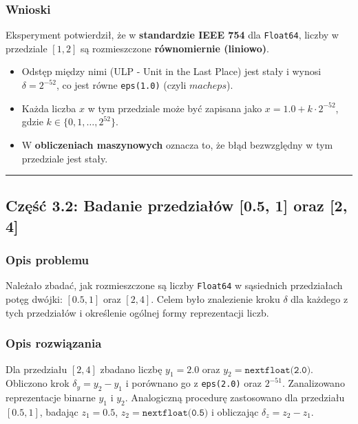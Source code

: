 \documentclass[11pt, a4paper]{article}
\newcommand{\taskseparator}{\leavevmode\leaders\hrule height 0.5pt\hfill\kern0pt}
\begin{document}
\subsubsection{Wnioski}
Eksperyment potwierdził, że w \textbf{standardzie IEEE 754} dla \texttt{Float64}, liczby w przedziale $[1, 2]$ są rozmieszczone \textbf{równomiernie (liniowo)}.
\begin{itemize}
    \item Odstęp między nimi (ULP - Unit in the Last Place) jest stały i wynosi $\delta = 2^{-52}$, co jest równe \texttt{eps(1.0)} (czyli $macheps$).
    \item Każda liczba $x$ w tym przedziale może być zapisana jako $x = 1.0 + k \cdot 2^{-52}$, gdzie $k \in \{0, 1, \dots, 2^{52}\}$.
    \item W \textbf{obliczeniach maszynowych} oznacza to, że błąd bezwzględny w tym przedziale jest stały.
\end{itemize}

\taskseparator

\subsection{Część 3.2: Badanie przedziałów [0.5, 1] oraz [2, 4]}

\subsubsection{Opis problemu}
Należało zbadać, jak rozmieszczone są liczby \texttt{Float64} w sąsiednich przedziałach potęg dwójki: $[0.5, 1]$ oraz $[2, 4]$. Celem było znalezienie kroku $\delta$ dla każdego z tych przedziałów i określenie ogólnej formy reprezentacji liczb.

\subsubsection{Opis rozwiązania}
Dla przedziału $[2, 4]$ zbadano liczbę $y_1 = 2.0$ oraz $y_2 = \texttt{nextfloat(2.0)}$. Obliczono krok $\delta_y = y_2 - y_1$ i porównano go z \texttt{eps(2.0)} oraz $2^{-51}$. Zanalizowano reprezentacje binarne $y_1$ i $y_2$. Analogiczną procedurę zastosowano dla przedziału $[0.5, 1]$, badając $z_1 = 0.5$, $z_2 = \texttt{nextfloat(0.5)}$ i obliczając $\delta_z = z_2 - z_1$.
\end{document}
